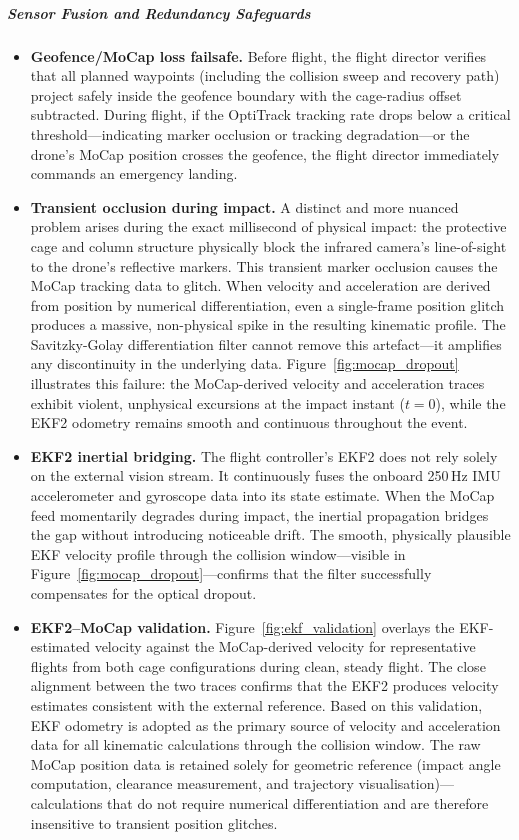 \subparagraph{Sensor Fusion and Redundancy Safeguards}

\begin{itemize}
    \item \textbf{Geofence/MoCap loss failsafe.} Before flight, the flight director verifies that all planned waypoints (including the collision sweep and recovery path) project safely inside the geofence boundary with the cage-radius offset subtracted. During flight, if the OptiTrack tracking rate drops below a critical threshold---indicating marker occlusion or tracking degradation---or the drone's MoCap position crosses the geofence, the flight director immediately commands an emergency landing.

    \item \textbf{Transient occlusion during impact.} A distinct and more nuanced problem arises during the exact millisecond of physical impact: the protective cage and column structure physically block the infrared camera's line-of-sight to the drone's reflective markers. This transient marker occlusion causes the MoCap tracking data to glitch. When velocity and acceleration are derived from position by numerical differentiation, even a single-frame position glitch produces a massive, non-physical spike in the resulting kinematic profile. The Savitzky-Golay differentiation filter cannot remove this artefact---it amplifies any discontinuity in the underlying data. Figure~\ref{fig:mocap_dropout} illustrates this failure: the MoCap-derived velocity and acceleration traces exhibit violent, unphysical excursions at the impact instant ($t = 0$), while the EKF2 odometry remains smooth and continuous throughout the event.

    \item \textbf{EKF2 inertial bridging.} The flight controller's EKF2 does not rely solely on the external vision stream. It continuously fuses the onboard 250\,Hz IMU accelerometer and gyroscope data into its state estimate. When the MoCap feed momentarily degrades during impact, the inertial propagation bridges the gap without introducing noticeable drift. The smooth, physically plausible EKF velocity profile through the collision window---visible in Figure~\ref{fig:mocap_dropout}---confirms that the filter successfully compensates for the optical dropout.

    \item \textbf{EKF2--MoCap validation.} Figure~\ref{fig:ekf_validation} overlays the EKF-estimated velocity against the MoCap-derived velocity for representative flights from both cage configurations during clean, steady flight. The close alignment between the two traces confirms that the EKF2 produces velocity estimates consistent with the external reference. Based on this validation, EKF odometry is adopted as the primary source of velocity and acceleration data for all kinematic calculations through the collision window. The raw MoCap position data is retained solely for geometric reference (impact angle computation, clearance measurement, and trajectory visualisation)---calculations that do not require numerical differentiation and are therefore insensitive to transient position glitches.


\end{itemize}
